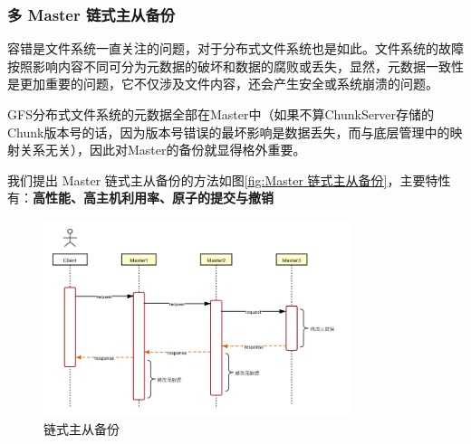 \documentclass[UTF8]{ctexart}
\begin{document}
\subsubsection{多 Master 链式主从备份}
容错是文件系统一直关注的问题，对于分布式文件系统也是如此。文件系统的故障按照影响内容不同可分为元数据的破坏和数据的腐败或丢失，显然，元数据一致性是更加重要的问题，它不仅涉及文件内容，还会产生安全或系统崩溃的问题。

GFS分布式文件系统的元数据全部在Master中（如果不算ChunkServer存储的Chunk版本号的话，因为版本号错误的最坏影响是数据丢失，而与底层管理中的映射关系无关），因此对Master的备份就显得格外重要。

我们提出 Master 链式主从备份的方法如图\ref{fig:Master 链式主从备份}，主要特性有：\textbf{高性能、高主机利用率、原子的提交与撤销}
\begin{figure}[h]
    \centering
    \includegraphics[width=0.8\textwidth, height=0.6\textwidth]{Master链式主从备份.png}
	\caption{链式主从备份}
	\label{fig:Master链式主从备份}
\end{figure}
\end{document}
